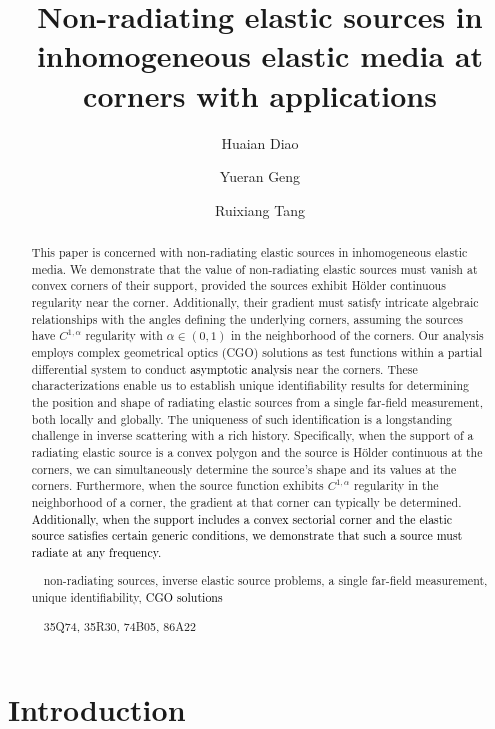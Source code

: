 \documentclass[11pt,reqno,oneside]{amsart}
\title[Non-radiating elastic sources at corners]{Non-radiating elastic sources in inhomogeneous elastic media at corners with applications}
\author{Huaian Diao}
\author{Yueran Geng}
\author{Ruixiang Tang}
\theoremstyle{definition}
\theoremstyle{remark}
\numberwithin{equation}{section}
\numberwithin{equation}{section}
\theoremstyle{remark}
\begin{document}
	\maketitle

	\begin{abstract}
		This paper is concerned with non-radiating elastic sources in inhomogeneous elastic media. We demonstrate that the value of non-radiating elastic sources must vanish at convex corners of their support, provided the sources exhibit H\"older continuous regularity near the corner. Additionally, their gradient must satisfy intricate algebraic relationships with the angles defining the underlying corners, assuming the sources have $C^{1,\alpha}$ regularity  with $\alpha\in (0,1)$ in the neighborhood of the corners. Our analysis employs complex geometrical optics (CGO) solutions as test functions within a partial differential system to conduct \textcolor{black}{asymptotic analysis} near the corners. These characterizations enable us to establish unique identifiability results for determining the position and shape of radiating elastic sources from a single far-field measurement, both locally and globally. The uniqueness of such identification is a longstanding challenge in inverse scattering with a rich history. Specifically, when the support of a radiating elastic source is a convex polygon and the source is H\"older continuous at the corners, we can simultaneously determine the source's shape and its values at the corners. Furthermore, when the source function exhibits $C^{1,\alpha}$ regularity in the neighborhood of a corner, the gradient at that corner can typically be determined. \textcolor{black}{Additionally, when the support includes a convex sectorial corner and the elastic source satisfies certain generic conditions, we demonstrate that such a source must radiate at any frequency.}
		
		
		
		
		
		
		
		~~non-radiating sources, inverse elastic source problems, a single far-field measurement, unique identifiability, \textcolor{black}{CGO solutions}
		
		
		~~35Q74, 35R30, 74B05, 86A22
	\end{abstract}

\section{Introduction} \label{section_introduction}
\end{document}
